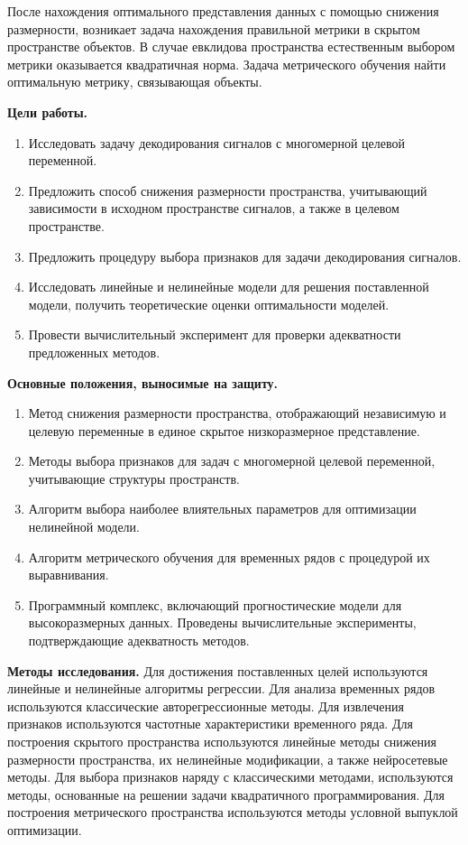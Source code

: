 После нахождения оптимального представления данных с помощью снижения размерности, возникает задача нахождения правильной метрики в скрытом пространстве объектов.
В случае евклидова пространства естественным выбором метрики оказывается квадратичная норма.
Задача метрического обучения найти оптимальную метрику, связывающая объекты.

\vspace{0.5cm}
\textbf{Цели работы.}
\begin{enumerate}
	\item Исследовать задачу декодирования сигналов с многомерной целевой переменной.
	\item Предложить способ снижения размерности пространства, учитывающий зависимости в исходном пространстве сигналов, а также в целевом пространстве.
	\item Предложить процедуру выбора признаков для задачи декодирования сигналов.
	\item Исследовать линейные и нелинейные модели для решения поставленной модели, получить теоретические оценки оптимальности моделей.
	\item Провести вычислительный эксперимент для проверки адекватности предложенных методов.
\end{enumerate}


\vspace{0.5cm}
\textbf{Основные положения, выносимые на защиту.}
\begin{enumerate}
	\item Метод снижения размерности пространства, отображающий независимую и целевую переменные в единое скрытое низкоразмерное представление.
	\item Методы выбора признаков для задач с многомерной целевой переменной, учитывающие структуры пространств.
	\item Алгоритм выбора наиболее влиятельных параметров для оптимизации нелинейной модели.
	\item Алгоритм метрического обучения для временных рядов с процедурой их выравнивания.
	\item Программный комплекс, включающий прогностические модели для высокоразмерных данных. Проведены вычислительные эксперименты, подтверждающие адекватность методов.
\end{enumerate}

\vspace{0.5cm}
\textbf{Методы исследования.}
Для достижения поставленных целей используются линейные и нелинейные алгоритмы регрессии.
Для анализа временных рядов используются классические авторегрессионные методы.
Для извлечения признаков используются частотные характеристики временного ряда.
Для построения скрытого пространства используются линейные методы снижения размерности пространства, их нелинейные модификации, а также нейросетевые методы.
Для выбора признаков наряду с классическими методами, используются методы, основанные на решении задачи квадратичного программирования.
Для построения метрического пространства используются методы условной выпуклой оптимизации.

